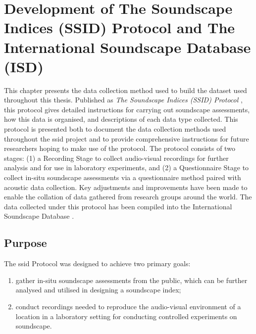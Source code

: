 \chapter{Development of The Soundscape Indices (SSID) Protocol and The International Soundscape Database (ISD)}
\label{chap:protocol}


This chapter presents the data collection method used to build the dataset used throughout this thesis. Published as \emph{The Soundscape Indices (SSID) Protocol} \citep{Mitchell2020Soundscape}, this protocol gives detailed instructions for carrying out soundscape assessments, how this data is organised, and descriptions of each data type collected. This protocol is presented both to document the data collection methods used throughout the \gls{ssid} project and to provide comprehensive instructions for future researchers hoping to make use of the protocol. The protocol consists of two stages: (1) a Recording Stage to collect audio-visual recordings for further analysis and for use in laboratory experiments, and (2) a Questionnaire Stage to collect in-situ soundscape assessments via a questionnaire method paired with acoustic data collection. Key adjustments and improvements have been made to enable the collation of data gathered from research groups around the world. The data collected under this protocol has been compiled into the International Soundscape Database \citep{Mitchell2021International}. 

\section{Purpose}

 The \gls{ssid} Protocol was designed to achieve two primary goals:
 \begin{enumerate}
   \item gather in-situ soundscape assessments from the public, which can be further analysed and utilised in designing a soundscape index;
   \item conduct recordings needed to reproduce the audio-visual environment of a location in a laboratory setting for conducting controlled experiments on soundscape.
 \end{enumerate}

